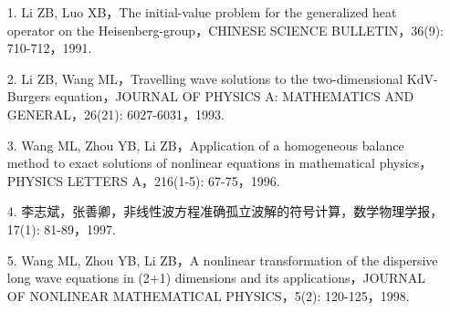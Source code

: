 \documentclass{beamer}
\begin{document}
\begin{frame}
  \begin{itemize}
    \item[1.] Li ZB, Luo XB，The initial-value problem for the generalized heat operator on the Heisenberg-group，CHINESE SCIENCE BULLETIN，36(9): 710-712，1991.
    \item[2.] Li ZB, Wang ML，Travelling wave solutions to the two-dimensional KdV-Burgers equation，JOURNAL OF PHYSICS A: MATHEMATICS AND GENERAL，26(21): 6027-6031，1993.
    \item[3.] Wang ML, Zhou YB, Li ZB，Application of a homogeneous balance method to exact solutions of nonlinear equations in mathematical physics，PHYSICS LETTERS A，216(1-5): 67-75，1996.
    \item [4.]李志斌，张善卿，非线性波方程准确孤立波解的符号计算，数学物理学报，17(1): 81-89，1997.
    \item[5.] Wang ML, Zhou YB, Li ZB，A nonlinear transformation of the dispersive long wave equations in (2+1) dimensions and its applications，JOURNAL OF NONLINEAR MATHEMATICAL PHYSICS，5(2): 120-125，1998.
  \end{itemize}
\end{frame}
\end{document}
